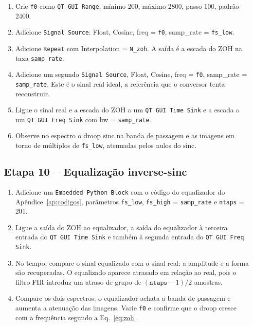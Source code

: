 \documentclass[11pt,a4paper]{article}
\begin{document}
\begin{instrucao}
\begin{enumerate}[label=\arabic*.]
  \item Crie \texttt{f0} como \texttt{QT GUI Range}, mínimo 200, máximo 2800,
    passo 100, padrão 2400.
  \item Adicione \texttt{Signal Source}: Float, Cosine, freq = \texttt{f0},
    samp\_rate = \texttt{fs\_low}.
  \item Adicione \texttt{Repeat} com Interpolation = \texttt{N\_zoh}. A saída é
    a escada do ZOH na taxa \texttt{samp\_rate}.
  \item Adicione um segundo \texttt{Signal Source}, Float, Cosine, freq =
    \texttt{f0}, samp\_rate = \texttt{samp\_rate}. Este é o sinal real ideal,
    a referência que o conversor tenta reconstruir.
  \item Ligue o sinal real e a escada do ZOH a um \texttt{QT GUI Time Sink} e a
    escada a um \texttt{QT GUI Freq Sink} com bw = \texttt{samp\_rate}.
  \item Observe no espectro o droop $\text{sinc}$ na banda de passagem e as
    imagens em torno de múltiplos de \texttt{fs\_low}, atenuadas pelos nulos
    do $\text{sinc}$.
\end{enumerate}
\end{instrucao}

\subsection*{Etapa 10 -- Equalização inverse-sinc}

\begin{instrucao}
\begin{enumerate}[label=\arabic*.]
  \item Adicione um \texttt{Embedded Python Block} com o código do
    equalizador do Apêndice~\ref{ap:codigos}, parâmetros \texttt{fs\_low},
    \texttt{fs\_high} = \texttt{samp\_rate} e \texttt{ntaps} = 201.
  \item Ligue a saída do ZOH ao equalizador, a saída do equalizador à terceira
    entrada do \texttt{QT GUI Time Sink} e também à segunda entrada do
    \texttt{QT GUI Freq Sink}.
  \item No tempo, compare o sinal equalizado com o sinal real: a amplitude e a
    forma são recuperadas. O equalizado aparece atrasado em relação ao real,
    pois o filtro FIR introduz um atraso de grupo de $(\texttt{ntaps}-1)/2$
    amostras.
  \item Compare os dois espectros: o equalizador achata a banda de passagem e
    aumenta a atenuação das imagens. Varie \texttt{f0} e confirme que o droop
    cresce com a frequência segundo a Eq.~\eqref{eq:zoh}.
\end{enumerate}
\end{instrucao}
\end{document}

